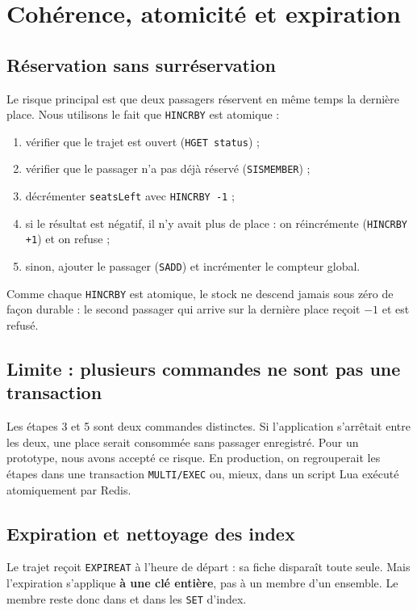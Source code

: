 \documentclass[11pt,a4paper]{article}
\newcommand{\cle}[1]{\texttt{\detokenize{#1}}}
\begin{document}
\section{Coh\'erence, atomicit\'e et expiration}

\subsection{R\'eservation sans surr\'eservation}
Le risque principal est que deux passagers r\'eservent en m\^eme temps la derni\`ere place. Nous utilisons le fait que \texttt{HINCRBY} est atomique :

\begin{enumerate}
  \item v\'erifier que le trajet est ouvert (\texttt{HGET status}) ;
  \item v\'erifier que le passager n'a pas d\'ej\`a r\'eserv\'e (\texttt{SISMEMBER}) ;
  \item d\'ecr\'ementer \texttt{seatsLeft} avec \texttt{HINCRBY -1} ;
  \item si le r\'esultat est n\'egatif, il n'y avait plus de place : on r\'eincr\'emente (\texttt{HINCRBY +1}) et on refuse ;
  \item sinon, ajouter le passager (\texttt{SADD}) et incr\'ementer le compteur global.
\end{enumerate}

Comme chaque \texttt{HINCRBY} est atomique, le stock ne descend jamais sous z\'ero de fa\c con durable : le second passager qui arrive sur la derni\`ere place re\c coit $-1$ et est refus\'e.

\subsection{Limite : plusieurs commandes ne sont pas une transaction}
Les \'etapes 3 et 5 sont deux commandes distinctes. Si l'application s'arr\^etait entre les deux, une place serait consomm\'ee sans passager enregistr\'e. Pour un prototype, nous avons accept\'e ce risque. En production, on regrouperait les \'etapes dans une transaction \texttt{MULTI/EXEC} ou, mieux, dans un script Lua ex\'ecut\'e atomiquement par Redis.

\subsection{Expiration et nettoyage des index}
Le trajet re\c coit \texttt{EXPIREAT} \`a l'heure de d\'epart : sa fiche \cle{ride:{id}} dispara\^it toute seule. Mais l'expiration s'applique \textbf{\`a une cl\'e enti\`ere}, pas \`a un membre d'un ensemble. Le membre \cle{ride:1} reste donc dans \cle{rides:geo} et dans les \texttt{SET} d'index.
\end{document}
